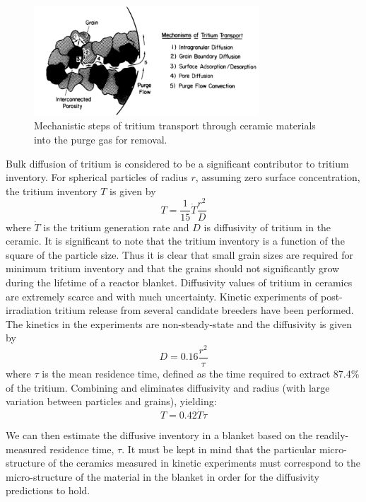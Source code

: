 \documentclass[11pt]{report} %
\begin{document}
\begin{figure}[ht]
	\centering
	\includegraphics[width=0.75\textwidth]{images/mechanisms_tritium_transport} 
	\caption{Mechanistic steps of tritium transport through ceramic materials into the purge gas for removal.}
	\label{fig:mechanisms_tritium_transport}
\end{figure}

Bulk diffusion of tritium is considered to be a significant contributor to tritium inventory. For spherical particles of radius $r$, assuming zero surface concentration, the tritium inventory $T$ is given by 
\begin{equation}\label{eq:inventory-diff}
T = \frac{1}{15}\dot{T}\frac{r^2}{D}
\end{equation}
where $\dot{T}$ is the tritium generation rate and $D$ is diffusivity of tritium in the ceramic. It is significant to note that the tritium inventory is a function of the square of the particle size. Thus it is clear that small grain sizes are required for minimum tritium inventory and that the grains should not significantly grow during the lifetime of a reactor blanket. Diffusivity values of tritium in ceramics are extremely scarce and with much uncertainty. Kinetic experiments of post-irradiation tritium release from several candidate breeders have been performed. The kinetics in the experiments are non-steady-state and the diffusivity is given by 
\begin{equation}\label{eq:exp-diff}
D = 0.16 \frac{r^2}{\tau}
\end{equation}
where $\tau$ is the mean residence time, defined as the time required to extract 87.4\% of the tritium. Combining  and  eliminates diffusivity and radius (with large variation between particles and grains), yielding:
\begin{equation}
T = 0.42 \dot{T}\tau
\end{equation}

We can then estimate the diffusive inventory in a blanket based on the readily-measured residence time, $\tau$. It must be kept in mind that the particular micro-structure of the ceramics measured in kinetic experiments must correspond to the micro-structure of the material in the blanket in order for the diffusivity predictions to hold.
\end{document}
